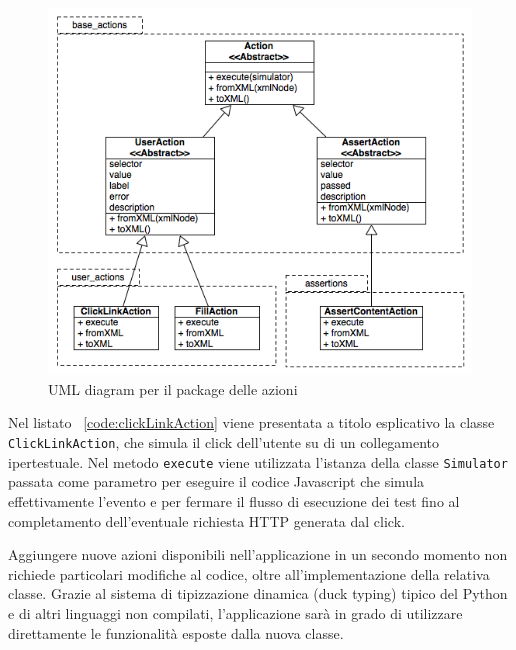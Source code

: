 \begin{figure}[htbp]
\begin{center}
\includegraphics[width=\textwidth]{images/uml_actions.png}
\caption{UML diagram per il package delle azioni}
\label{fig:actionUML}
\end{center}
\end{figure}

Nel listato ~\ref{code:clickLinkAction} viene presentata a titolo esplicativo la classe \verb|ClickLinkAction|, che simula il click dell'utente su di un collegamento ipertestuale. Nel metodo \verb|execute| viene utilizzata l'istanza della classe \verb|Simulator| passata come parametro per eseguire il codice Javascript che simula effettivamente l'evento e per fermare il flusso di esecuzione dei test fino al completamento dell'eventuale richiesta HTTP generata dal click.



Aggiungere nuove azioni disponibili nell'applicazione in un secondo momento non richiede particolari modifiche al codice, oltre all'implementazione della relativa classe. Grazie al sistema di tipizzazione dinamica (duck typing) tipico del Python e di altri linguaggi non compilati, l'applicazione sarà in grado di utilizzare direttamente le funzionalità esposte dalla nuova classe.


